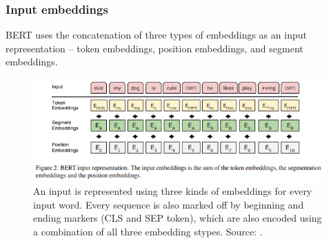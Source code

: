 \subsubsection{Input embeddings}
\label{sub:tokens}
BERT uses the concatenation of three types of embeddings as an input representation -- token embeddings, position embeddings, and segment embeddings.
\begin{figure}[H]
\centering
\includegraphics[width=1\columnwidth]{../img/bert_embeddings}
\protect\caption[BERT embeddings]{ An input is represented using three kinds of embeddings for every input word. Every sequence is also marked off by beginning and ending markers (CLS and SEP token), which are also encoded using a combination of all three embedding stypes.
Source: \textit{\citep{Devlin2019}}.}
\label{pic:bert_emb}
\end{figure}
